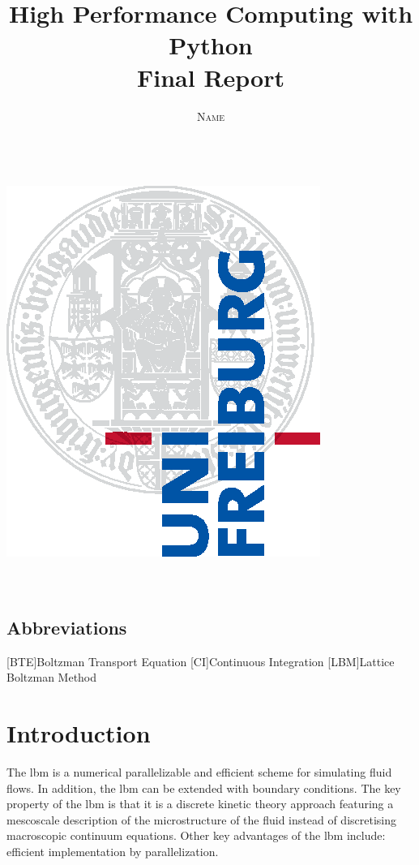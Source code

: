 \documentclass[a4paper,11pt, footsepline]{book}
\title{\Huge \textbf{High Performance Computing with Python} \vspace{4mm} \\ \huge Final Report}
\author{\textsc{Name} \\ \vspace{3mm}\text{matricular number}  \\
\vspace{3mm}\text{mail}}
\begin{document}
\makeatletter
    \begin{titlepage}
        \begin{center}
            \includegraphics[width=0.5\linewidth]{logos/Uni_Logo-Grundversion_E1_A4_CMYK.eps}\\[4ex]
            {\huge \bfseries  \@title }\\[2ex] 
            {\LARGE  \@author}\\[30ex] 
            {\large \@date}
        \end{center}
    \end{titlepage}
\makeatother
\thispagestyle{empty}
\newpage



\tableofcontents

\begin{acronym}
\section*{Abbreviations}
[BTE]{Boltzman Transport Equation}
[CI]{Continuous Integration}
[LBM]{Lattice Boltzman Method}
\end{acronym}
\mainmatter

\chapter{Introduction}
\cite{timm2016lattice}

The \acf{lbm} is a numerical parallelizable and efficient scheme for simulating fluid flows. In addition, the \ac{lbm} can be extended with boundary conditions. The key property of the \ac{lbm} is that it is a discrete kinetic theory approach featuring a mescoscale description of the microstructure of the fluid instead of discretising macroscopic continuum equations. Other key advantages of the \ac{lbm} include: efficient implementation by parallelization.
\end{document}

